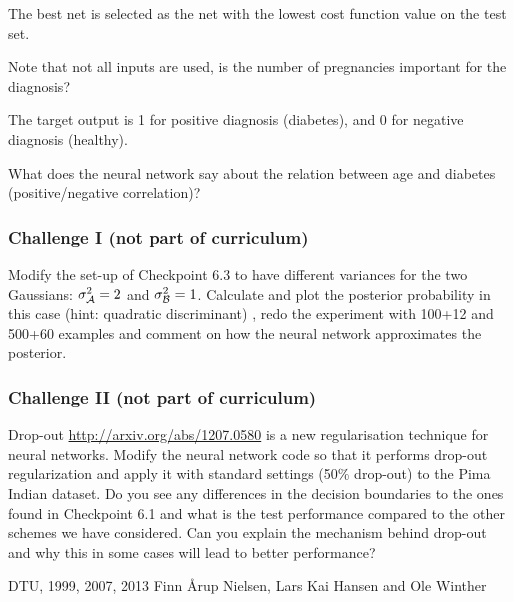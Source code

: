 \documentclass[12pt]{article}    %
\begin{document}
The best net is selected as the net with the lowest cost function value
on the test set.

Note that not all inputs are used, is the number of pregnancies
important for the diagnosis?

The target output is 1 for positive diagnosis (diabetes), and 0 for negative diagnosis (healthy).

What does the neural network say about the relation between age and
diabetes (positive/negative correlation)?

\subsubsection*{Challenge I (not part of curriculum)}

Modify the set-up of Checkpoint 6.3 to have different variances for the two Gaussians: $\sigma_{\cal A}^2=2$ and $\sigma_{\cal B}^2=1$. Calculate and plot the posterior probability in this case (hint: quadratic discriminant) , redo the experiment with 100+12 and 500+60 examples and comment on how the neural network approximates the posterior.

\subsubsection*{Challenge II (not part of curriculum)}

Drop-out \url{http://arxiv.org/abs/1207.0580} is a new regularisation technique for neural networks. Modify the neural network code so that it performs drop-out regularization and apply it with standard settings (50\% drop-out) to the Pima Indian dataset. Do you see any differences in the decision boundaries to the ones found in Checkpoint 6.1 and what is the test performance compared to the other schemes we have considered. Can you explain the mechanism behind drop-out and why this in some cases will lead to better performance?


\vspace{2cm}
DTU, 1999, 2007, 2013
Finn \AA rup Nielsen, Lars Kai Hansen and Ole Winther
\end{document}
